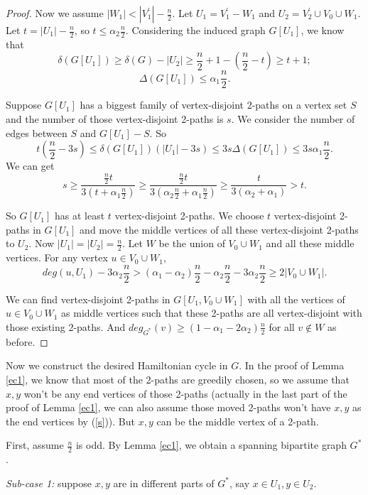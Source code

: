 \documentclass[11pt]{article}
\begin{document}
\begin{proof}
Now we assume $|W_1|< |V_1^{'}|-\frac{n}{2}$. Let $U_1=V_1^{'}-W_1$ and $U_2=V_2^{'}\cup V_0\cup W_1$. Let $t=|U_1|-\frac{n}{2}$, so $t\leq \alpha_2\frac{n}{2}$. Considering the induced graph $G[U_1]$, we know that
$$\delta (G[U_1])\geq \delta (G)-|U_2|\geq \frac{n}{2}+1-(\frac{n}{2}-t)\geq t+1;$$
$$\Delta(G[U_1])\leq \alpha_1\frac{n}{2}.$$

Suppose $G[U_1]$ has a biggest family of vertex-disjoint 2-paths on a vertex set $S$ and the number of those vertex-disjoint 2-paths is $s$. We consider the number of edges between $S$ and $G[U_1]-S$. So
$$t(\frac{n}{2}-3s)\leq \delta (G[U_1])(|U_1|-3s)\leq 3s\Delta(G[U_1])\leq 3s\alpha_1\frac{n}{2}.$$
We can get
\begin{equation}\label{s}
s\geq \frac{\frac{n}{2}t}{3(t+\alpha_1\frac{n}{2})}\geq \frac{\frac{n}{2}t}{3(\alpha_2\frac{n}{2}+\alpha_1\frac{n}{2})}\geq \frac{t}{3(\alpha_2+\alpha_1)}>t.
\end{equation}

So $G[U_1]$ has at least $t$ vertex-disjoint 2-paths. We choose $t$ vertex-disjoint 2-paths in $G[U_1]$ and move the middle vertices of all these vertex-disjoint 2-paths to $U_2$. Now $|U_1|=|U_2|=\frac{n}{2}$. Let $W$ be the union of $V_0\cup W_1$ and all these middle vertices. For any vertex $u\in V_0\cup W_1$,
$$deg(u,U_1)-3\alpha_2\frac{n}{2}>(\alpha_1-\alpha_2)\frac{n}{2}-\alpha_2\frac{n}{2}-3\alpha_2\frac{n}{2}\geq 2|V_0\cup W_1|.$$

We can find vertex-disjoint 2-paths in $G[U_1,V_0\cup W_1]$ with all the vertices of $u\in V_0\cup W_1$ as middle vertices such that these 2-paths are all vertex-disjoint with those existing 2-paths. And $deg_{G^*}(v)\geq (1-\alpha_1-2\alpha_2)\frac{n}{2}$ for all $v\not \in W$ as before.
\end{proof}

Now we construct the desired Hamiltonian cycle in $G$. In the proof of Lemma \ref{ec1}, we know that most of  the 2-paths are greedily chosen, so we assume that $x,y$ won't be any end vertices of those 2-paths (actually in the last part of the proof of Lemma \ref{ec1}, we can also assume those moved 2-paths won't have $x,y$ as the end vertices by (\ref{s})). But $x,y$ can be the middle vertex of a 2-path.

First, assume $\frac{n}{2}$ is odd. By Lemma \ref{ec1}, we obtain a spanning bipartite graph $G^*$.

\noindent
{\em Sub-case 1:} suppose $x,y$ are in different parts of $G^*$, say $x\in U_1, y\in U_2$.
\end{document}
